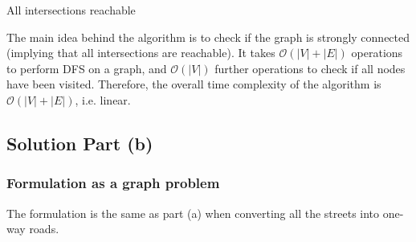 \documentclass[12pt]{article}
\begin{document}
\begin{algorithm}[H]

    \SetAlgoLined \DontPrintSemicolon


    \caption{All intersections reachable}
    \label{alg:part1a}
\end{algorithm}

The main idea behind the algorithm is to check if the graph is strongly connected (implying that all intersections are reachable). It takes $\mathcal{O}(|V| + |E|)$ operations to perform DFS on a graph, and $\mathcal{O}(|V|)$ further operations to check if all nodes have been visited. Therefore, the overall time complexity of the algorithm is $\mathcal{O}(|V| + |E|)$, i.e. linear.

\subsection{Solution Part (b)}

\subsubsection{Formulation as a graph problem}

The formulation is the same as part (a) when converting all the streets into one-way roads.
\end{document}
